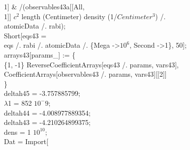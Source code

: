      1] \& /\@ (observables43a[[All, \\
        1]] $c^2$ length (Centimeter) density (1/$Centimeter^3$) /. \\
      atomicData /. rabi);\\
Short[eqs43 = \\
   eqs /. rabi /. atomicData /. \{Mega -\textgreater $10^{6}$, Second -\textgreater 1\}, 50];\\
arrays43[params\_] := \{\\
  \{1, -1\} Reverse\@ CoefficientArrays[eqs43 /. params, vars43], \\
  CoefficientArrays[observables43 /. params, vars43][[2]]\\
  \}\\
deltah45 = -3.757885799;\\
$\lambda$1 = 852 $10^-9$;\\
deltah44 = -4.008977889354;\\
deltah43 = -4.210264899375;\\
dens = 1 $10^10$;\\

Dat = Import[\\


